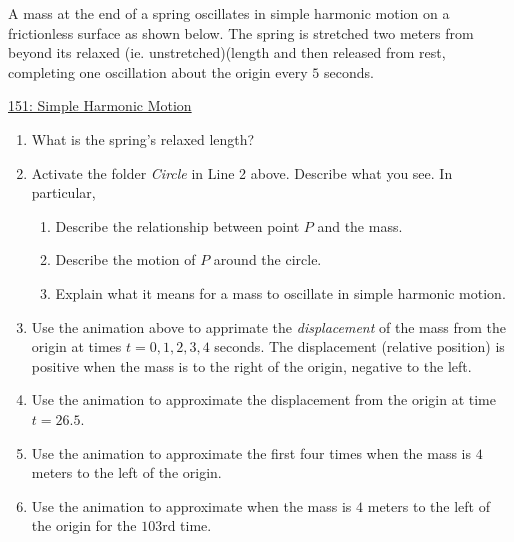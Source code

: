 \documentclass{ximera}
\begin{document}
\begin{example}  \label{Ex:LLL}
A mass at the end of a spring oscillates in simple harmonic motion on a frictionless surface as shown below. The spring is stretched two meters from beyond its relaxed (ie. unstretched)(length and then released from rest, completing one oscillation about the origin every $5$ seconds.

\begin{onlineOnly}
    \begin{center}
\end{center}
\end{onlineOnly}

\href{https://www.desmos.com/calculator/dcba538898}{151: Simple Harmonic Motion}

\begin{enumerate}
\item What is the spring's relaxed length?

\item Activate the folder \emph{Circle} in Line 2 above. Describe what you see. In particular,
\begin{enumerate}
\item Describe the relationship between point $P$ and the mass.

\item Describe the motion of $P$ around the circle.

\item Explain what it means for a mass to oscillate in simple harmonic motion. 
\end{enumerate}

\item Use the animation above to apprimate the \emph{displacement} of the mass from the origin at times $t=0, 1, 2, 3, 4$ seconds. The displacement (relative position) is positive when the mass is to the right of the origin, negative to the left.

\item Use the animation to approximate the displacement from the origin at time $t=26.5$.

\item Use the animation to approximate the first four times when the mass is $4$ meters to the left of the origin.

\item Use the animation to approximate when the mass is $4$ meters to the left of the origin for the $103$rd time.
\end{enumerate}
\end{example}
\end{document}
